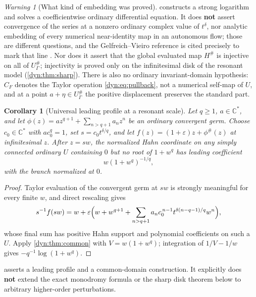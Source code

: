 \documentclass[11pt,letterpaper]{article}
\newtheorem{corollary}[corollary]{Corollary}
\theoremstyle{definition}
\theoremstyle{remark}
\newtheorem{warning}[warning]{Warning}
\newcommand{\C}{\mathbb C}
\newcommand{\eps}{\varepsilon}
\numberwithin{equation}{section}
\begin{document}
\begin{warning}[What kind of embedding was proved]\label{dyn:warn:embedding}
 constructs a strong logarithm and solves a
coefficientwise ordinary differential equation. It does \textbf{not} assert
convergence of the series at a nonzero ordinary complex value of
$t^{\delta}$, nor analytic embedding of every numerical near-identity map
in an autonomous flow; those are different questions, and the
Gelfreich--Vieiro reference is cited precisely to mark that line
\cite{GV}. Nor does it assert that the global evaluated map $H^{\#}$ is
injective on all of $U^{\#}_\Gamma$; injectivity is proved only on the
infinitesimal disk of the resonant model (\cref{dyn:thm:sharp}). There is
also no ordinary invariant-domain hypothesis: $C_F$ denotes the Taylor
operation \eqref{dyn:eq:pullback}, not a numerical self-map of $U$, and at
a point $a+\eta\in U^{\#}_\Gamma$ the positive displacement preserves the
standard part.
\end{warning}

\begin{corollary}[Universal leading profile at a resonant scale]
\label{dyn:cor:universal}
Let $q\ge1$, $a\in\C^{*}$, and let
$\phi(z)=az^{q+1}+\sum_{n>q+1}a_nz^{n}$ be an ordinary convergent germ.
Choose $c_0\in\C^{*}$ with $ac_0^{q}=1$, set $s=c_0t^{\delta/q}$, and let
$f(z)=(1+\eps)z+\phi^{\#}(z)$ at infinitesimal $z$. After $z=sw$, the
normalized Hahn coordinate on any simply connected ordinary $U$ containing
$0$ but no root of $1+w^{q}$ has leading coefficient
\begin{equation}\label{dyn:eq:universalprofile}
 w(1+w^{q})^{-1/q},
\end{equation}
with the branch normalized at $0$.
\end{corollary}
\begin{proof}
Taylor evaluation of the convergent germ at $sw$ is strongly meaningful for
every finite $w$, and direct rescaling gives
\[
 s^{-1}f(sw)=w+\eps\Bigl(w+w^{q+1}
 +\sum_{n>q+1}a_nc_0^{\,n-1}t^{\delta(n-q-1)/q}w^{n}\Bigr),
\]
whose final sum has positive Hahn support and polynomial coefficients on
such a $U$. Apply \cref{dyn:thm:common} with $V=w(1+w^{q})$; integration of
$1/V-1/w$ gives $-q^{-1}\log(1+w^{q})$.
\end{proof}

 asserts a leading profile and a common-domain
construction. It explicitly does \textbf{not} extend the exact monodromy
formula or the sharp disk theorem below to arbitrary higher-order
perturbations.
\end{document}
